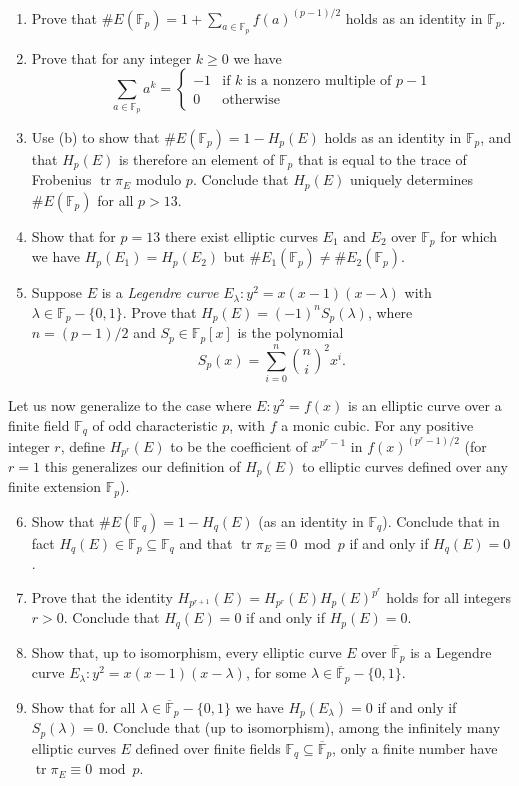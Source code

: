 \documentclass[11pt]{article}
\newcommand{\Fp}{\mathbb{F}_p}
\newcommand{\Fpbar}{\overline{\mathbb{F}}_p}
\newcommand{\Fq}{\mathbb{F}_q}
\newcommand{\tr}{\operatorname{tr}}
\begin{document}
\begin{enumerate}[{\bf (a)}]
\item Prove that $\#E(\Fp) = 1+\sum_{a\in \Fp}f(a)^{(p-1)/2}$ holds as an identity in $\Fp$.
\item Prove that for any integer $k\ge 0$ we have
\[
\sum_{a\in \Fp} a^k = \begin{cases}
-1 & \text{if $k$ is a nonzero multiple of $p-1$}\\
0 & \text{otherwise}
\end{cases}
\]
\item Use (b) to show that $\#E(\Fp) = 1 - H_p(E)$ holds as an identity in $\Fp$, and that $H_p(E)$ is therefore an element of $\Fp$ that is equal to the trace of Frobenius $\tr\pi_E$ modulo $p$.
Conclude that $H_p(E)$ uniquely determines $\#E(\Fp)$ for all $p > 13$.
\item Show that for $p=13$ there exist elliptic curves $E_1$ and $E_2$ over $\Fp$ for which we have $H_p(E_1)=H_p(E_2)$ but $\#E_1(\Fp)\ne \#E_2(\Fp)$.
\item Suppose $E$ is a \emph{Legendre curve} $E_\lambda\colon y^2=x(x-1)(x-\lambda)$ with $\lambda\in \Fp-\{0,1\}$.
Prove that $H_p(E)=(-1)^nS_p(\lambda)$, where $n=(p-1)/2$ and $S_p\in \Fp[x]$ is the polynomial
\[
S_p(x)=\sum_{i=0}^n \binom{n}{i}^2x^i.
\]
\end{enumerate}
Let us now generalize to the case where $E\colon y^2=f(x)$ is an elliptic curve over a finite field $\Fq$ of odd characteristic $p$, with $f$ a monic cubic.
For any positive integer $r$, define $H_{p^r}(E)$ to be the coefficient of $x^{p^r-1}$ in $f(x)^{(p^r-1)/2}$ (for $r=1$ this generalizes our definition of $H_p(E)$ to elliptic curves defined over any finite extension $\Fp$).
\begin{enumerate}[{\bf (a)}]
\setcounter{enumi}{5}
\item Show that $\#E(\Fq)=1-H_q(E)$ (as an identity in $\Fq$).  Conclude that in fact $H_q(E)\in\Fp\subseteq \Fq$ and that $\tr\pi_E\equiv 0\bmod p$ if and only if $H_q(E)=0$.
\item Prove that the identity $H_{p^{r+1}}(E)=H_{p^r}(E)H_p(E)^{p^r}$ holds for all integers $r>0$.  Conclude that $H_q(E)=0$ if and only if $H_p(E)=0$.
\item Show that, up to isomorphism, every elliptic curve $E$ over $\Fpbar$ is a Legendre curve $E_\lambda\colon y^2=x(x-1)(x-\lambda)$, for some $\lambda\in\Fpbar-\{0,1\}$.
\item Show that for all $\lambda\in \Fpbar-\{0,1\}$ we have $H_p(E_\lambda)=0$ if and only if $S_p(\lambda)=0$.  Conclude that (up to isomorphism), among the infinitely many elliptic curves $E$ defined over finite fields $\Fq\subseteq\Fpbar$, only a finite number have $\tr \pi_E \equiv 0\bmod p$.
\end{enumerate}
\end{document}
